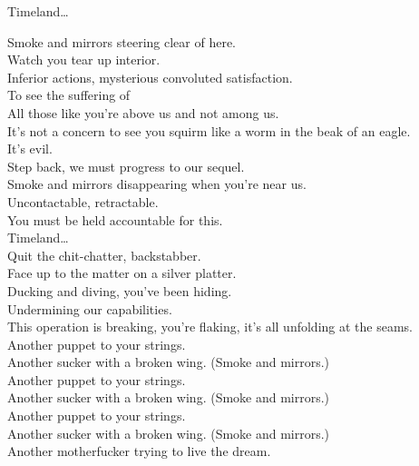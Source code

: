 \label{album:made-in-timeland}




Timeland… \\




Smoke and mirrors steering clear of here. \\
Watch you tear up interior. \\
Inferior actions, mysterious convoluted satisfaction. \\
To see the suffering of \\
All those like you're above us and not among us. \\
It's not a concern to see you squirm like a worm in the beak of an eagle. \\
It's evil. \\
Step back, we must progress to our sequel. \\

Smoke and mirrors disappearing when you're near us. \\
Uncontactable, retractable. \\
You must be held accountable for this. \\

Timeland… \\

Quit the chit-chatter, backstabber. \\
Face up to the matter on a silver platter. \\
Ducking and diving, you've been hiding. \\
Undermining our capabilities. \\
This operation is breaking, you're flaking, it's all unfolding at the seams. \\

Another puppet to your strings. \\
Another sucker with a broken wing. (Smoke and mirrors.) \\
Another puppet to your strings. \\
Another sucker with a broken wing. (Smoke and mirrors.) \\
Another puppet to your strings. \\
Another sucker with a broken wing. (Smoke and mirrors.) \\
Another motherfucker trying to live the dream. \\
